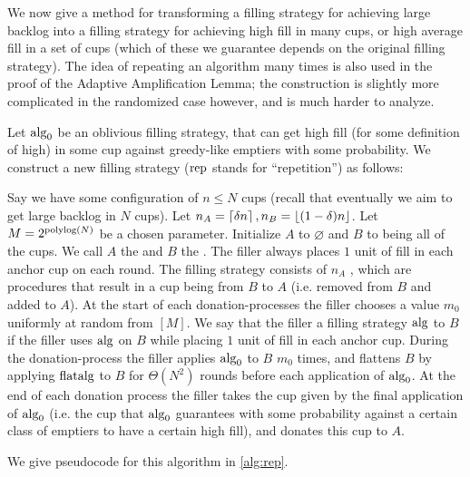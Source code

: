 We now give a method for transforming a filling strategy for achieving
large backlog into a filling strategy for achieving high fill in
many cups, or high average fill in a set of cups (which of these
we guarantee depends on the original filling strategy). The idea
of repeating an algorithm many times is also used in the proof of
the Adaptive Amplification Lemma; the construction is slightly more
complicated in the randomized case however, and is much harder to
analyze.

\begin{definition}
  \label{def:rep}
  {\normalfont
  Let $\operatorname{\text{\textup{alg}}}_0$ be an oblivious filling strategy, that can get
  high fill (for some definition of high) in some cup against
  greedy-like emptiers with some probability. We construct a new
  filling strategy  ($\operatorname{\text{\textup{rep}}}$ stands
  for \enquote{repetition}) as follows:

  Say we have some configuration of $n\le N$ cups (recall that
  eventually we aim to get large backlog in $N$ cups).
  Let $n_A = \left\lceil \delta n \right\rceil, n_B = \left\lfloor (1-\delta)n \right\rfloor$. Let
  $M=2^{\operatorname{\text{polylog}}(N)}$ be a chosen parameter. 
  Initialize $A$ to $\varnothing$ and $B$ to
  being all of the cups. We call $A$ the  and
  $B$ the . The filler always places $1$
  unit of fill in each anchor cup on each round. The filling
  strategy consists of $n_A$ , which are
  procedures that result in a cup being  from $B$
  to $A$ (i.e. removed from $B$ and added to $A$). At the start
  of each donation-processes the filler chooses a value $m_0$
  uniformly at random from $[M]$. We say that the filler
   a filling strategy $\operatorname{\text{\textup{alg}}}$ to $B$ if the
  filler uses $\operatorname{\text{\textup{alg}}}$ on $B$ while placing $1$ unit of fill
  in each anchor cup. During the donation-process the filler
  applies $\operatorname{\text{\textup{alg}}}_0$ to $B$ $m_0$ times, and flattens $B$ by
  applying $\operatorname{\text{\textup{flatalg}}}$ to $B$ for $\Theta(N^2)$ rounds before each
  application of $\operatorname{\text{\textup{alg}}}_0$. At the end of each donation process
  the filler takes the cup given by the final application of
  $\operatorname{\text{\textup{alg}}}_0$ (i.e. the cup that $\operatorname{\text{\textup{alg}}}_0$ guarantees with some
  probability against a certain class of emptiers to have a
  certain high fill), and donates this cup to $A$. 

  We give pseudocode for this algorithm in \cref{alg:rep}.
 }


\end{definition}
